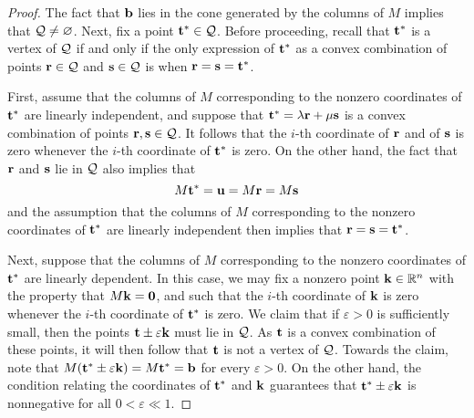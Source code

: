 \documentclass[11pt]{amsart}
\begin{document}
\begin{proof}  The fact that $\mathbf{b}$ lies in the cone generated by the columns of $M$ implies that $\mathcal{Q} \neq  \varnothing$.  Next, fix a point $\mathbf{t}^{\ast} \in \mathcal{Q}$.  Before proceeding, recall that $\mathbf{t}^{\ast}$ is a vertex of $\mathcal{Q}$ if and only if the only expression of $\mathbf{t}^{\ast}$ as a convex combination of points $\mathbf{r} \in \mathcal{Q}$ and $\mathbf{s} \in \mathcal{Q}$ is when $\mathbf{r}=\mathbf{s}=\mathbf{t}^{\ast}$.

First, assume that the columns of $M$ corresponding to the nonzero coordinates of $\mathbf{t}^{\ast}$ are linearly independent, and suppose that $\mathbf{t}^{\ast} = \lambda \mathbf{r} + \mu \mathbf{s}$ is a convex combination of points $\mathbf{r}, \mathbf{s} \in \mathcal{Q}$.  It follows that the $i$-th coordinate of $\mathbf{r}$ and of $\mathbf{s}$ is zero whenever the $i$-th coordinate of $\mathbf{t}^{\ast}$ is zero.  On the other hand, the fact that $\mathbf{r}$ and $\mathbf{s}$ lie in $\mathcal{Q}$ also implies that 
\[ M \mathbf{t}^{\ast} = \mathbf{u} = M \mathbf{r} = M \mathbf{s} \] 
and the assumption that the columns of $M$ corresponding to the nonzero coordinates of $\mathbf{t}^{\ast}$ are linearly independent then implies that $\mathbf{r}=\mathbf{s}=\mathbf{t}^{\ast}$.

Next, suppose that the columns of $M$ corresponding to the nonzero coordinates of $\mathbf{t}^{\ast}$ are linearly dependent.   In this case, we may fix a nonzero point $\mathbf{k} \in \mathbb{R}^n$ with the property that $M \mathbf{k} = \mathbf{0}$, and such that the $i$-th coordinate of $\mathbf{k}$ is zero whenever the $i$-th coordinate of $\mathbf{t}^{\ast}$ is zero.  We claim that if $\varepsilon > 0$ is sufficiently small, then the points $\mathbf{t} \pm \varepsilon \mathbf{k}$ must lie in $\mathcal{Q}$.   As $\mathbf{t}$ is a convex combination of these points, it will then follow that $\mathbf{t}$ is not a vertex of $\mathcal{Q}$.  Towards the claim, note that $M(\mathbf{t}^{\ast} \pm \varepsilon \mathbf{k}) = M \mathbf{t}^{\ast} = \mathbf{b}$ for every $\varepsilon > 0$.  On the other hand, the condition relating the coordinates of $\mathbf{t}^{\ast}$ and $\mathbf{k}$ guarantees that $\mathbf{t}^{\ast} \pm \varepsilon \mathbf{k}$ is nonnegative for all $0 < \varepsilon \ll 1$.  
%
\end{proof}
\end{document}
